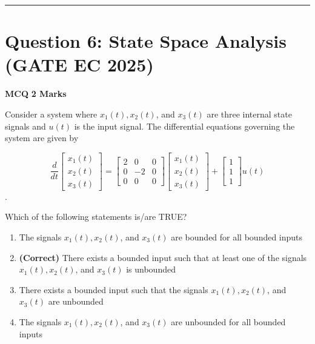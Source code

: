 \documentclass[11pt,a4paper]{article}
\begin{document}
\vspace{1.5em}
\hrule
\vspace{1.5em}

\section*{Question 6: State Space Analysis (GATE EC 2025)}
\noindent \textbf{\color{primary}MCQ} \hfill \textbf{\color{secondary}2 Marks}


\noindent Consider a system where ${x}_{1}({t}), {x}_{2}({t})$, and ${x}_{3}({t})$ are three internal state signals and $u(t)$ is the input signal. The differential equations governing the system are given by

\[
\frac{d}{d t}\left[\begin{array}{l}x_{1}(t) \\ x_{2}(t) \\ x_{3}(t)\end{array}\right]=\left[\begin{array}{ccc}2 & 0 & 0 \\ 0 & -2 & 0 \\ 0 & 0 & 0\end{array}\right]\left[\begin{array}{l}x_{1}(t) \\ x_{2}(t) \\ x_{3}(t)\end{array}\right]+\left[\begin{array}{l}1 \\ 1 \\ 1\end{array}\right] u(t)
\]
.

Which of the following statements is/are TRUE?


\begin{enumerate}[label=(\Alph*)]
    \item The signals $x_{1}(t), x_{2}(t)$, and $x_{3}(t)$ are bounded for all bounded inputs
    \item \textbf{(Correct)} There exists a bounded input such that at least one of the signals $x_{1}(t), x_{2}(t)$, and $x_{3}(t)$ is unbounded
    \item There exists a bounded input such that the signals $x_{1}(t), x_{2}(t)$, and $x_{3}(t)$ are unbounded
    \item The signals $x_{1}(t), x_{2}(t)$, and $x_{3}(t)$ are unbounded for all bounded inputs
\end{enumerate}
\end{document}
